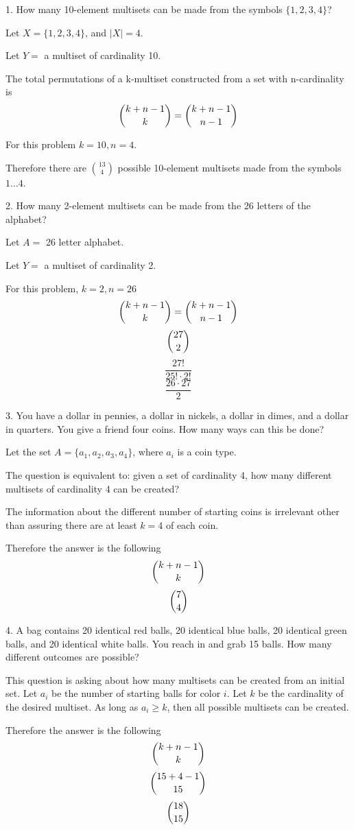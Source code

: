 \documentclass{hippoidC}
\begin{document}
\toc

\begin{prooflist}{1. How many 10-element multisets can be made from the symbols $\{ 1,2,3,4\}$?}
	\item Let $X= \{ 1,2,3,4\}$, and $|X|=4$.
	\item Let $Y=$ a multiset of cardinality 10.
	\item The total permutations of a k-multiset constructed from a set with
	n-cardinality is
	$$ \dbinom{k+n-1}{k} = \dbinom{k+n-1}{n-1} $$
	\item For this problem $k=10, n=4$.
	\item Therefore there are $\binom{13}{4}$ possible 10-element multisets made
	from the symbols $1\dots4$.
\end{prooflist}

\begin{prooflist}{2. How many 2-element multisets can be made from the 26 letters of the alphabet?}
	\item Let $A=$ 26 letter alphabet.
	\item Let $Y=$ a multiset of cardinality 2.
	\item For this problem, $k=2, n=26$
	$$ \dbinom{k+n-1}{k} = \dbinom{k+n-1}{n-1} $$
	$$ \dbinom{27}{2}$$
	$$ \dfrac{27!}{25!\cdot2!}$$
	$$ \dfrac{26\cdot27}{2}$$
\end{prooflist}

\begin{prooflist}{3. You have a dollar in pennies, a dollar in nickels, a dollar in dimes, and a dollar in quarters. You give a friend four coins. How many ways can this be done?}
	\item Let the set $A= \{a_1, a_2, a_3, a_4\}$, where $a_i$ is a coin type.
	\item The question is equivalent to: given a set of cardinality 4, how many
	different multisets of cardinality 4 can be created?
	\item The information about the different number of starting coins is
	irrelevant other than assuring there are at least $k=4$ of each coin.
	\item Therefore the answer is the following
	$$ \dbinom{k+n-1}{k} $$
	$$ \dbinom{7}{4}$$
\end{prooflist}

\begin{prooflist}{4. A bag contains 20 identical red balls, 20 identical blue
		balls, 20 identical green balls, and 20 identical white balls. You reach in
		and grab 15 balls. How many different outcomes are possible?}
	\item This question is asking about how many multisets can be created from
	an initial set. Let $a_i$ be the number of starting balls for color $i$.
	Let $k$ be the cardinality of the desired multiset. As long as $a_i\geq k$,
	then all possible multisets can be created.
	\item Therefore the answer is the following
	$$ \dbinom{k+n-1}{k} $$
	$$ \dbinom{15+4-1}{15}$$
	$$ \dbinom{18}{15}$$
	\item
\end{prooflist}
\end{document}
